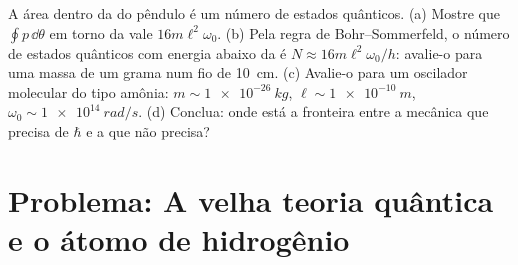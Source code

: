 \begin{exercise}[$\star\star\star$]\label{exo:b3:hamiltonian-mechanics:12}
A área dentro da  do pêndulo é um número de estados
quânticos. (a) Mostre que $\oint p\,\dd\theta$ em torno da 
vale $16m\ell^2\omega_0$. (b) Pela regra de Bohr--Sommerfeld, o número
de estados quânticos com energia abaixo da  é $N \approx
16m\ell^2\omega_0/h$: avalie-o para uma massa de um grama num fio de
\qty{10}{cm}. (c) Avalie-o para um oscilador molecular do tipo amônia:
$m \sim \qty{1e-26}{kg}$, $\ell \sim \qty{1e-10}{m}$,
$\omega_0 \sim \qty{1e14}{rad/s}$. (d) Conclua: onde está a fronteira
entre a mecânica que precisa de $\hbar$ e a que não precisa?
\end{exercise}

\section{Problema: A velha teoria quântica e o átomo de hidrogênio}

